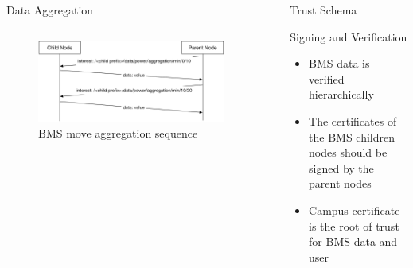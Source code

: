 \documentclass[final,hyperref={pdfpagelabels=false},20pt]{beamer}
\begin{document}
\begin{frame}[t]
\begin{columns}[t]
\begin{column}{.465\textwidth}
\begin{block}{Data Aggregation}
\begin{columns}[T]
\begin{column}{.56\textwidth}
\begin{figure}
\includegraphics[width=\linewidth]{bms-move-aggregate-sequence}
\caption{BMS move aggregation sequence}
\label{fig:move-aggregation}
\end{figure}
\end{column}

\end{columns}

\end{block}

\end{column} %

\begin{column}{.02\textwidth}\end{column} %
 
\begin{column}{.465\textwidth} %


\begin{block}{Trust Schema}

Signing and Verification

\begin{itemize}
\item{BMS data is verified hierarchically}
\item{The certificates of the BMS children nodes should be signed by the parent nodes}
\item{Campus certificate is the root of trust for BMS data and user}
\end{itemize}


\end{block}
\end{column}
\end{columns}
\end{frame}
\end{document}
